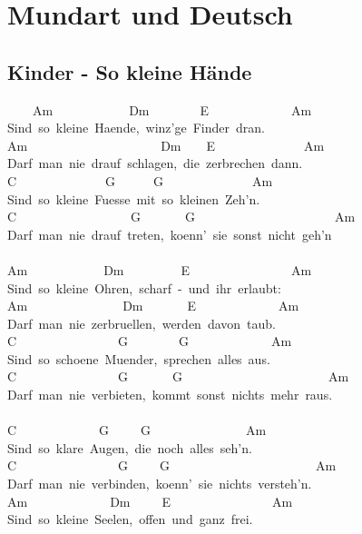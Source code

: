 \documentclass[]{book}
\let\stdsection\section
\renewcommand\section{\clearpage\stdsection}
\begin{document}
\hypertarget{mundart-und-deutsch}{%
\chapter{Mundart und Deutsch}\label{mundart-und-deutsch}}

\hypertarget{kinder---so-kleine-hande}{%
\section{Kinder - So kleine Hände}\label{kinder---so-kleine-hande}}

~~~~Am~~~~~~~~~~~~Dm~~~~~~~~E~~~~~~~~~~~~~Am~\\
Sind~so~kleine~Haende,~winz'ge~Finder~dran.\\
Am~~~~~~~~~~~~~~~~~~~~~Dm~~~~E~~~~~~~~~~~~~~Am\\
Darf~man~nie~drauf~schlagen,~die~zerbrechen~dann.\\
C~~~~~~~~~~~~~~G~~~~~~G~~~~~~~~~~~~~~Am\\
Sind~so~kleine~Fuesse~mit~so~kleinen~Zeh'n.\\
C~~~~~~~~~~~~~~~~~~G~~~~~~~G~~~~~~~~~~~~~~~~~~~~~~Am\\
Darf~man~nie~drauf~treten,~koenn'~sie~sonst~nicht~geh'n\\
~\\
Am~~~~~~~~~~~~Dm~~~~~~~~~E~~~~~~~~~~~~~~~~Am~\\
Sind~so~kleine~Ohren,~scharf~-~und~ihr~erlaubt:\\
Am~~~~~~~~~~~~~~~Dm~~~~~~~E~~~~~~~~~~~~~Am~\\
Darf~man~nie~zerbruellen,~werden~davon~taub.\\
C~~~~~~~~~~~~~~~~G~~~~~~~~G~~~~~~~~~~~~~Am\\
Sind~so~schoene~Muender,~sprechen~alles~aus.\\
C~~~~~~~~~~~~~~~~G~~~~~~~G~~~~~~~~~~~~~~~~~~~~~~~Am\\
Darf~man~nie~verbieten,~kommt~sonst~nichts~mehr~raus.\\
~\\
C~~~~~~~~~~~~~G~~~~~G~~~~~~~~~~~~~~~Am~\\
Sind~so~klare~Augen,~die~noch~alles~seh'n.\\
C~~~~~~~~~~~~~~~~G~~~~~G~~~~~~~~~~~~~~~~~~~~~~~Am~\\
Darf~man~nie~verbinden,~koenn'~sie~nichts~versteh'n.\\
Am~~~~~~~~~~~~~Dm~~~~~E~~~~~~~~~~~~~~~~Am\\
Sind~so~kleine~Seelen,~offen~und~ganz~frei.\\
\end{document}

